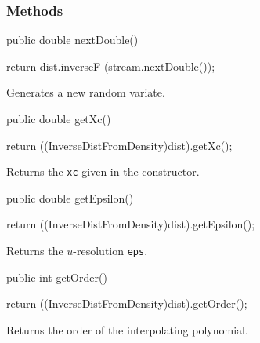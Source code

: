 \subsubsection* {Methods}
\begin{code}

   public double nextDouble() \begin{hide} {
      return dist.inverseF (stream.nextDouble());
   }\end{hide}
\end{code}
 \begin{tabb} Generates a new random variate.
 \end{tabb}
\begin{code}

   public double getXc()\begin{hide} {
      return ((InverseDistFromDensity)dist).getXc();
   }\end{hide}
\end{code}
\begin{tabb}
   Returns the \texttt{xc} given in the constructor.
\end{tabb}
\begin{code}

   public double getEpsilon()\begin{hide} {
      return ((InverseDistFromDensity)dist).getEpsilon();
   }
\end{hide}
\end{code}
\begin{tabb}
   Returns the $u$-resolution \texttt{eps}.
\end{tabb}
\begin{code}

   public int getOrder()\begin{hide} {
      return ((InverseDistFromDensity)dist).getOrder();
   }
\end{hide}
\end{code}
\begin{tabb}
   Returns the order of the interpolating polynomial.
\end{tabb}
\begin{hide}
\begin{code}
}\end{code}
\end{hide}
